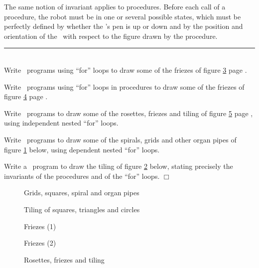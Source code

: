 The same notion of invariant applies to procedures. Before each
call of a procedure, the robot must be in one or several
possible states, which must be perfectly defined by whether the
\robot's pen is up or down
and by the position and orientation
of the \robot\ with respect to the figure drawn by the procedure.

\noindent \rule{137mm}{0.1mm}\par\nopagebreak %
\begin{exercices}{\ \\

\vspace{-\baselineskip}
\tiret Write \python\ programs using ``for'' loops to draw
some of the friezes of figure
\ref{fig:Frise-1}  page \pageref{fig:Frise-1}.

\tiret Write \python\ programs using ``for'' loops in pro\-ce\-dures
to draw some of the friezes of figure
\ref{fig:Frise-2}  page \pageref{fig:Frise-2}.

\tiret Write \python\ programs to draw some of the rosettes,
friezes and tiling of figure
\ref{fig:Ro-Fr-Pa}  page \pageref{fig:Ro-Fr-Pa}, using independent
nested ``for'' loops.

\tiret Write \python\ programs to draw some of the spirals,
grids and other organ pipes of figure
\ref{fig:SpirQuadTuy}  below, using dependent nested
``for'' loops.

\tiret Write a \python\ program to draw the tiling of
figure \ref{fig:PavCLC} below, stating precisely the
invariants of the procedures and of the ``for'' loops.
\noindent $\Box$}\end{exercices}
\begin{figure}[htbp]
 \caption{Grids, squares, spiral and organ pipes}
 \label{fig:SpirQuadTuy}
\end{figure}
\begin{figure}[htbp]
 \caption{Tiling of squares, triangles and circles}\label{fig:PavCLC}
\end{figure}
\begin{figure}[htbp]
 \caption{Friezes (1)}\label{fig:Frise-1}
\end{figure}
\begin{figure}[htbp]
 \caption{Friezes (2)}\label{fig:Frise-2}
\end{figure}
\begin{figure}[htbp]
 \caption{Rosettes, friezes and tiling}\label{fig:Ro-Fr-Pa}
\end{figure}

